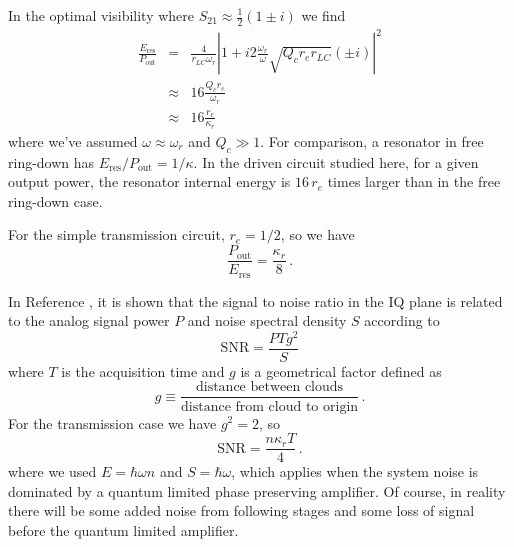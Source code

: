 In the optimal visibility where $S_{21}\approx\frac{1}{2}\left(1 \pm i \right)$ we find \begin{eqnarray}
\frac{E_{\text{res}}}{P_{\text{out}}} &=& \frac{4}{r_{LC}\omega_r}\left| 1 + i2\frac{\omega_r}{\omega} \sqrt{Q_c r_e r_{LC}}(\pm i) \right|^2 \nonumber \\
& \approx & 16 \frac{Q_c r_e }{\omega_r}\nonumber \\
& \approx & 16 \frac{r_e}{\kappa_r} \label{eq:sec:resonatorEnergyToOutputPowerRatio:ratio_lambda4_optimal} \end{eqnarray}
where we've assumed $\omega \approx \omega_r$ and $Q_c \gg 1$.
For comparison, a resonator in free ring-down has $E_{\text{res}}/P_{\text{out}} = 1/\kappa$.
In the driven circuit studied here, for a given output power, the resonator internal energy is $16 \, r_e$ times larger than in the free ring-down case.

For the simple transmission circuit, $r_e = 1/2$, so we have
\begin{equation*}
  \frac{P_\text{out}}{E_\text{res}} = \frac{\kappa_r}{8} \, .
\end{equation*}

In Reference \cite{Sank:demodulated_noise_stack_exchange}, it is shown that the signal to noise ratio in the IQ plane is related to the analog signal power $P$ and noise spectral density $S$ according to
\begin{equation}
  \text{SNR} = \frac{P T g^2}{S}
\end{equation}
where $T$ is the acquisition time and $g$ is a geometrical factor defined as
\begin{equation*}
  g \equiv \frac{\text{distance between clouds}}{\text{distance from cloud to origin}} \, .
\end{equation*}
For the transmission case we have $g^2=2$, so
\begin{equation*}
  \text{SNR} = \frac{n \kappa_r T}{4} \, .
\end{equation*}
where we used $E = \hbar \omega n$ and $S = \hbar \omega$, which applies when the system noise is dominated by a quantum limited phase preserving amplifier.
Of course, in reality there will be some added noise from following stages and some loss of signal before the quantum limited amplifier.
